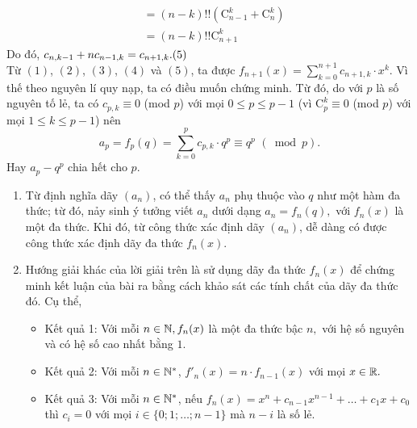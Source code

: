\begin{bt}
{{\begin{align*}
		&=(n-k)!!(\mathrm{C}_{n-1}^{k}+\mathrm{C}_{n}^{k})\\
		&=(n-k)!!\mathrm{C}_{n+1}^{k}
		\end{align*}}Do đó, $c_{n,k-1}+nc_{n-1,k}=c_{n+1,k}.\hfill (5)$\\
		Từ $(1)$, $(2)$, $(3)$, $(4)$ và $(5)$, ta được $f_{n+1}(x)=\sum\limits_{k=0}^{n+1}c_{n+1,k}\cdot x^k.$
		Vì thế theo nguyên lí quy nạp, ta có điều muốn chứng minh.
		Từ đó, do với $p$ là số nguyên tố lẻ, ta có
		$c_{p,k}\equiv 0$ (mod $p$) với mọi $0\le p\le p-1$ (vì $\mathrm{C}_p^k\equiv 0$ (mod $p$) với mọi $1\le k\le p-1$) nên $$a_p=f_p(q)=\sum\limits_{k=0}^{p}c_{p,k}\cdot q^p\equiv q^p\,\, (\bmod p).$$
		Hay $a_p-q^p$ chia hết cho $p.$
		\begin{nx}\hfill
			\begin{enumerate}
				\item %
				Từ định nghĩa dãy $(a_n)$, có thể thấy $a_n$ phụ thuộc vào $q$ như một hàm đa thức; từ đó, nảy sinh ý tưởng viết $a_n$ dưới dạng $a_n=f_n(q),$
				với $f_n(x)$ là một đa thức. Khi đó, từ công thức xác định dãy $(a_n)$, dễ dàng có được công thức xác định dãy đa thức $f_n(x)$.
				\item %
				Hướng giải khác của lời giải trên là sử dụng dãy đa thức $f_n(x)$ để chứng minh kết luận của bài ra bằng cách khảo sát các tính chất của dãy đa thức đó. Cụ thể, %
				\begin{itemize}
					\item {Kết quả 1:} Với mỗi $n\in \Bbb{N}, f_n(x)$ là một đa thức bậc $n,$ với hệ số nguyên và có hệ số cao nhất bằng $1.$
					\item {Kết quả 2:} Với mỗi $n\in \Bbb{N^*}$, $f'_n(x)=n\cdot f_{n-1}(x)$ với mọi $x\in \Bbb{R}.$
					\item {Kết quả 3:} Với mỗi $n\in \Bbb{N^*}$, nếu $f_n(x)=x^n+c_{n-1}x^{n-1}+\ldots+c_1x+c_0$ thì $c_i=0$ với mọi $i\in \{0;1;\ldots;n-1\}$ mà $n-i$ là số lẻ.
				\end{itemize}
			\end{enumerate}
		\end{nx}
	}
	
\end{bt}
